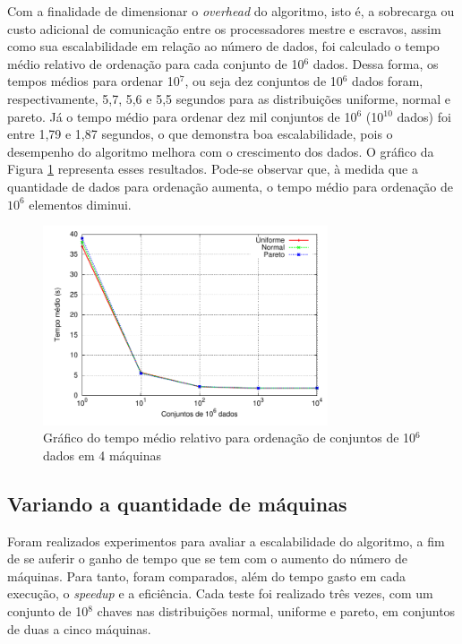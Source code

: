 Com a finalidade de dimensionar o \textit{overhead} do algoritmo, isto é, a sobrecarga ou custo adicional de comunicação entre os processadores mestre e escravos, assim como sua escalabilidade em relação ao número de dados, foi calculado o tempo médio relativo de ordenação para cada conjunto de 10$^6$ dados. 
Dessa forma, os tempos médios para ordenar 10$^7$, ou seja dez conjuntos de 10$^6$ dados foram, respectivamente, 5,7, 5,6 e 5,5 segundos para as distribuições uniforme, normal e pareto.
Já o tempo médio para ordenar dez mil conjuntos de 10$^6$  (10$^{10}$ dados) foi entre 1,79 e 1,87 segundos, o que demonstra boa escalabilidade, pois o desempenho do algoritmo melhora com o crescimento dos dados. 
O gráfico da Figura \ref{fig:DadosOverhead} representa esses resultados. 
Pode-se observar que, à medida que a quantidade de dados para ordenação aumenta, o tempo médio para ordenação de $10^6$ elementos diminui. 

\begin{figure}[htb]
\centering
\includegraphics[width=0.75\textwidth]{figuras/DadosOverhead.pdf}
\caption{Gráfico do tempo médio relativo para ordenação de conjuntos de 10$^6$ dados em 4 máquinas}
\label{fig:DadosOverhead}
\end{figure}


\subsection{Variando a quantidade de máquinas}

Foram realizados experimentos para avaliar a escalabilidade do algoritmo, a fim de se auferir o ganho de tempo que se tem com o aumento do número de máquinas. Para tanto, foram comparados, além do tempo gasto em cada execução, o \textit{speedup} e a eficiência. Cada teste foi realizado três vezes, com um conjunto de 10$^8$ chaves nas distribuições normal, uniforme e pareto, em conjuntos de duas a cinco máquinas. 

